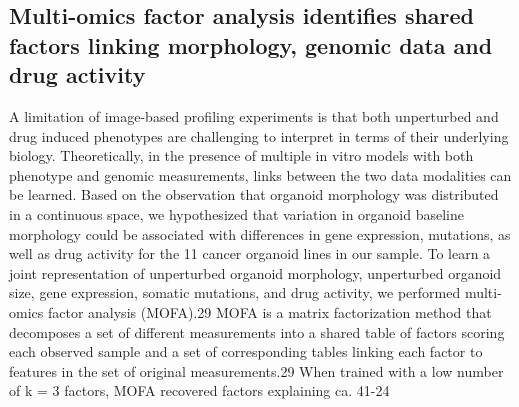 \begin{flushleft}
\section{Multi-omics factor analysis identifies shared factors linking morphology, genomic data and drug activity}

A limitation of image-based profiling experiments is that both unperturbed and drug induced phenotypes are challenging to interpret in terms of their underlying biology. Theoretically, in the presence of multiple in vitro models with both phenotype and genomic measurements, links between the two data modalities can be learned. Based on the observation that organoid morphology was distributed in a continuous space, we hypothesized that variation in organoid baseline morphology could be associated with differences in gene expression, mutations, as well as drug activity for the 11 cancer organoid lines in our sample. To learn a joint representation of unperturbed organoid morphology, unperturbed organoid size, gene expression, somatic mutations, and drug activity, we performed multi-omics factor analysis (MOFA).29 MOFA is a matrix factorization method that decomposes a set of different measurements into a shared table of factors scoring each observed sample and a set of corresponding tables linking each factor to features in the set of original measurements.29 When trained with a low number of k = 3 factors, MOFA recovered factors explaining ca. 41-24%
\end{flushleft}
